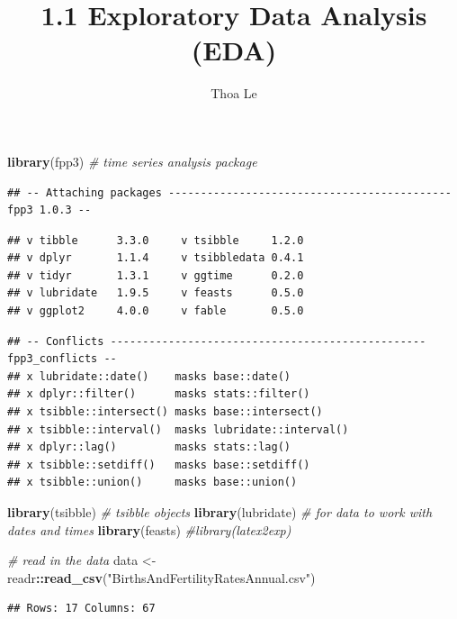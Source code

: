 \documentclass[
]{article}
\title{1.1 Exploratory Data Analysis (EDA)}
\author{Thoa Le}
\date{}
\newenvironment{Shaded}{\begin{snugshade}}{\end{snugshade}}
\newcommand{\CommentTok}[1]{\textcolor[rgb]{0.56,0.35,0.01}{\textit{#1}}}
\newcommand{\FunctionTok}[1]{\textcolor[rgb]{0.13,0.29,0.53}{\textbf{#1}}}
\newcommand{\NormalTok}[1]{#1}
\newcommand{\OtherTok}[1]{\textcolor[rgb]{0.56,0.35,0.01}{#1}}
\newcommand{\SpecialCharTok}[1]{\textcolor[rgb]{0.81,0.36,0.00}{\textbf{#1}}}
\newcommand{\StringTok}[1]{\textcolor[rgb]{0.31,0.60,0.02}{#1}}
\begin{document}
\maketitle

\begin{Shaded}
\begin{Highlighting}[]
\FunctionTok{library}\NormalTok{(fpp3) }\CommentTok{\# time series analysis package}
\end{Highlighting}
\end{Shaded}

\begin{verbatim}
## -- Attaching packages -------------------------------------------- fpp3 1.0.3 --
\end{verbatim}

\begin{verbatim}
## v tibble      3.3.0     v tsibble     1.2.0
## v dplyr       1.1.4     v tsibbledata 0.4.1
## v tidyr       1.3.1     v ggtime      0.2.0
## v lubridate   1.9.5     v feasts      0.5.0
## v ggplot2     4.0.0     v fable       0.5.0
\end{verbatim}

\begin{verbatim}
## -- Conflicts ------------------------------------------------- fpp3_conflicts --
## x lubridate::date()    masks base::date()
## x dplyr::filter()      masks stats::filter()
## x tsibble::intersect() masks base::intersect()
## x tsibble::interval()  masks lubridate::interval()
## x dplyr::lag()         masks stats::lag()
## x tsibble::setdiff()   masks base::setdiff()
## x tsibble::union()     masks base::union()
\end{verbatim}

\begin{Shaded}
\begin{Highlighting}[]
\FunctionTok{library}\NormalTok{(tsibble) }\CommentTok{\# tsibble objects}
\FunctionTok{library}\NormalTok{(lubridate) }\CommentTok{\# for data to work with dates and times}
\FunctionTok{library}\NormalTok{(feasts)}
\CommentTok{\#library(latex2exp)}

\CommentTok{\# read in the data}
\NormalTok{data }\OtherTok{\textless{}{-}}\NormalTok{ readr}\SpecialCharTok{::}\FunctionTok{read\_csv}\NormalTok{(}\StringTok{"BirthsAndFertilityRatesAnnual.csv"}\NormalTok{)}
\end{Highlighting}
\end{Shaded}

\begin{verbatim}
## Rows: 17 Columns: 67
\end{verbatim}
\end{document}
